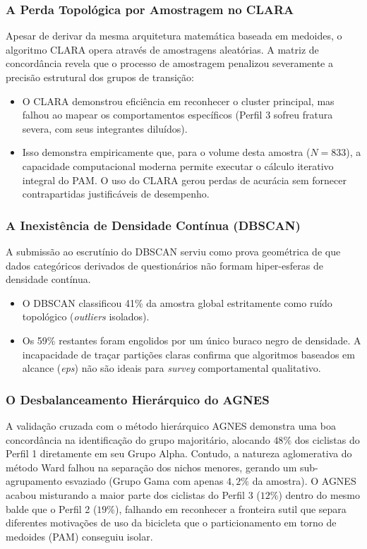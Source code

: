 \documentclass[12pt]{article}
\begin{document}
\subsubsection{A Perda Topológica por Amostragem no CLARA}
Apesar de derivar da mesma arquitetura matemática baseada em medoides, o algoritmo CLARA opera através de amostragens aleatórias. A matriz de concordância revela que o processo de amostragem penalizou severamente a precisão estrutural dos grupos de transição:
\begin{itemize}
    \item O CLARA demonstrou eficiência em reconhecer o cluster principal, mas falhou ao mapear os comportamentos específicos (Perfil 3 sofreu fratura severa, com seus integrantes diluídos).
    \item Isso demonstra empiricamente que, para o volume desta amostra ($N = 833$), a capacidade computacional moderna permite executar o cálculo iterativo integral do PAM. O uso do CLARA gerou perdas de acurácia sem fornecer contrapartidas justificáveis de desempenho.
\end{itemize}

\subsubsection{A Inexistência de Densidade Contínua (DBSCAN)}
A submissão ao escrutínio do DBSCAN serviu como prova geométrica de que dados categóricos derivados de questionários não formam hiper-esferas de densidade contínua.
\begin{itemize}
    \item O DBSCAN classificou 41\% da amostra global estritamente como ruído topológico (\textit{outliers} isolados).
    \item Os 59\% restantes foram engolidos por um único buraco negro de densidade. A incapacidade de traçar partições claras confirma que algoritmos baseados em alcance (\textit{eps}) não são ideais para \textit{survey} comportamental qualitativo.
\end{itemize}

\subsubsection{O Desbalanceamento Hierárquico do AGNES}
A validação cruzada com o método hierárquico AGNES demonstra uma boa concordância na identificação do grupo majoritário, alocando $48\%$ dos ciclistas do Perfil 1 diretamente em seu Grupo Alpha. Contudo, a natureza aglomerativa do método Ward falhou na separação dos nichos menores, gerando um sub-agrupamento esvaziado (Grupo Gama com apenas $4,2\%$ da amostra). O AGNES acabou misturando a maior parte dos ciclistas do Perfil 3 ($12\%$) dentro do mesmo balde que o Perfil 2 ($19\%$), falhando em reconhecer a fronteira sutil que separa diferentes motivações de uso da bicicleta que o particionamento em torno de medoides (PAM) conseguiu isolar.
\end{document}
